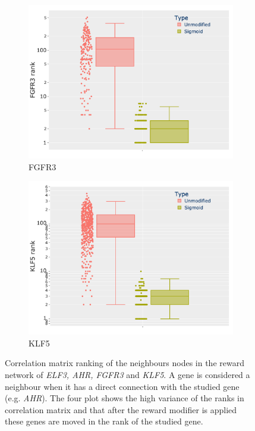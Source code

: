 \begin{figure}[H]
    \centering
    \begin{subfigure}{0.49\linewidth}
        \includegraphics[width=1.0\textwidth,height=1.0\textheight,keepaspectratio]{Sections/Network_II/resources/reward/corr_analysis/FGFR3_box.png}
        \caption{FGFR3}
        \label{fig:N_II:ahr_corr}
    \end{subfigure}
    \begin{subfigure}{0.49\linewidth}
        \includegraphics[width=1.0\textwidth,height=1.0\textheight,keepaspectratio]{Sections/Network_II/resources/reward/corr_analysis/KLF5_box.png}
        \caption{KLF5}
        \label{fig:N_II:ahr_corr}
    \end{subfigure}
    \caption{Correlation matrix ranking of the neighbours nodes in the reward network of \textit{ELF3, AHR, FGFR3} and \textit{KLF5}. A gene is considered a neighbour   when it has a direct connection with the studied gene (e.g. \textit{AHR}). The four plot shows the high variance of the ranks in correlation matrix and that after the reward modifier is applied these genes are moved in the rank of the studied gene. }
    \label{fig:N_II:corr_analysis}
\end{figure}



